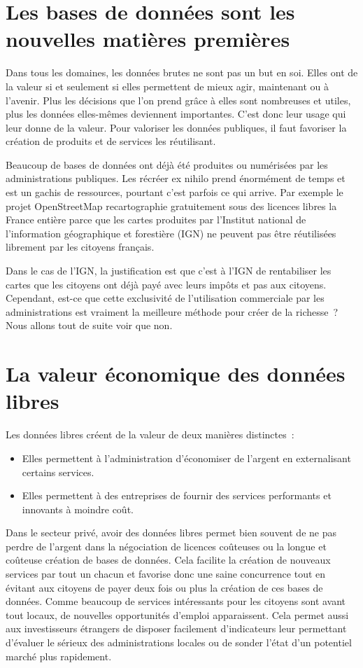 \section{Les bases de données sont les nouvelles matières premières}

Dans tous les domaines, les données brutes ne sont pas un but en soi. Elles ont de la valeur si et seulement si elles permettent de mieux agir, maintenant ou à l'avenir. Plus les décisions que l'on prend grâce à elles sont nombreuses et utiles, plus les données elles-mêmes deviennent importantes. C'est donc leur usage qui leur donne de la valeur. Pour valoriser les données publiques, il faut favoriser la création de produits et de services les réutilisant. 

Beaucoup de bases de données ont déjà été produites ou numérisées par les administrations publiques. Les récréer ex nihilo prend énormément de temps et est un gachis de ressources, pourtant c'est parfois ce qui arrive. Par exemple le projet OpenStreetMap recartographie gratuitement sous des licences libres la France entière parce que les cartes produites par l'Institut national de l’information géographique et forestière (IGN) ne peuvent pas être réutilisées librement par les citoyens français. 

Dans le cas de l'IGN, la justification est que c'est à l'IGN de rentabiliser les cartes que les citoyens ont déjà payé avec leurs impôts et pas aux citoyens. Cependant, est-ce que cette exclusivité de l'utilisation commerciale par les administrations est vraiment la meilleure méthode pour créer de la richesse~? Nous allons tout de suite voir que non.

\section{La valeur économique des données libres}

Les données libres créent de la valeur de deux manières distinctes~:

\begin{itemize}
\item Elles permettent à l'administration d'économiser de l'argent en externalisant certains services.
\item Elles permettent à des entreprises de fournir des services performants et innovants à moindre coût.
\end{itemize}

Dans le secteur privé, avoir des données libres permet bien souvent de ne pas perdre de l'argent dans la négociation de licences coûteuses ou la longue et coûteuse création de bases de données. Cela facilite la création de nouveaux services par tout un chacun et favorise donc une saine concurrence tout en évitant aux citoyens de payer deux fois ou plus la création de ces bases de données. Comme beaucoup de services intéressants pour les citoyens sont avant tout locaux, de nouvelles opportunités d'emploi apparaissent. Cela permet aussi aux investisseurs étrangers de disposer facilement d'indicateurs leur permettant d'évaluer le sérieux des administrations locales ou de sonder l'état d'un potentiel marché plus rapidement.

